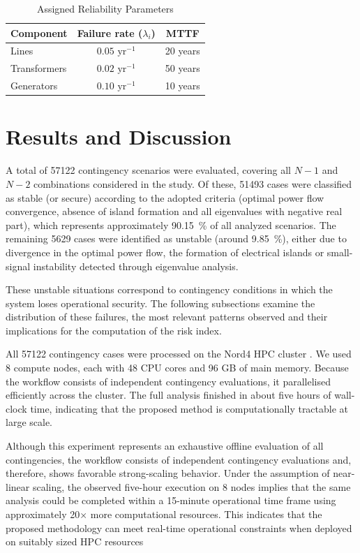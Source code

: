 \documentclass[journal]{IEEEtran}
\begin{document}
\begin{table}[htbp]
    \caption{Assigned Reliability Parameters}
    \label{tab:reliability}
    \centering
    \begin{tabular}{l c c}
    \hline
    \textbf{Component} & \textbf{Failure rate ($\lambda_i$)} & \textbf{MTTF} \\
    \hline
        Lines & $0.05 \text{ yr}^{-1}$ & 20 years \\
        Transformers & $0.02 \text{ yr}^{-1}$ & 50 years \\
        Generators & $0.10 \text{ yr}^{-1}$ & 10 years \\
    \hline
    \end{tabular}
\end{table}


\section{Results and Discussion}
\label{results}

A total of \num{57122} contingency scenarios were evaluated, covering all $N-1$ and $N-2$ combinations considered in the study. Of these, \num{51493} cases were classified as stable (or secure) according to the adopted criteria (optimal power flow convergence, absence of island formation and all eigenvalues with negative real part), which represents approximately \qty{90.15}{\percent} of all analyzed scenarios. The remaining \num{5629} cases were identified as unstable (around \qty{9.85}{\percent}), either due to divergence in the optimal power flow, the formation of electrical islands or small-signal instability detected through eigenvalue analysis.

These unstable situations correspond to contingency conditions in which the system loses operational security. The following subsections examine the distribution of these failures, the most relevant patterns observed and their implications for the computation of the risk index.

All \num{57122} contingency cases were processed on the Nord4 HPC cluster \cite{nord4_bsc}. We used 8 compute nodes, each with 48 CPU cores and 96 GB of main memory. Because the workflow consists of independent contingency evaluations, it parallelised efficiently across the cluster. The full analysis finished in about five hours of wall-clock time, indicating that the proposed method is computationally tractable at large scale.

Although this experiment represents an exhaustive offline evaluation of all contingencies, the workflow consists of independent contingency evaluations and, therefore, shows favorable strong-scaling behavior. Under the assumption of near-linear scaling, the observed five-hour execution on 8 nodes implies that the same analysis could be completed within a 15-minute operational time frame using approximately 20× more computational resources. This indicates that the proposed methodology can meet real-time operational constraints when deployed on suitably sized HPC resources
\end{document}
